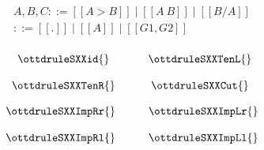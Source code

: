 \documentclass[11pt]{article}
\begin{document}
\[
\begin{array}{lll}
  A,B,C ::= [[A > B]] \mid [[A \ B]] \mid [[B / A]]\\
  [[G]] ::= [[.]] \mid [[A]] \mid [[G1,G2]]\\
\end{array}
\]

\[
\begin{array}{ccc}
  \ottdruleSXXid{}  & \quad & \ottdruleSXXTenL{}\\
  \\
  \ottdruleSXXTenR{} & \quad & \ottdruleSXXCut{}
\end{array}
\]

\[
\begin{array}{ccc}
  \ottdruleSXXImpRr{} & \quad & \ottdruleSXXImpLr{}\\
  \\
  \ottdruleSXXImpRl{} & \quad & \ottdruleSXXImpLl{}
\end{array}
\]
\end{document}
